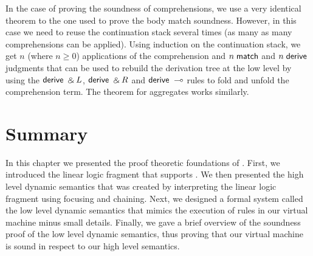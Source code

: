 In the case of proving the soundness of comprehensions, we use a very identical theorem to the one used
to prove the body match soundness. However, in this case we need to reuse the continuation stack several
times (as many as many comprehensions can be applied). Using induction on the continuation stack, we get
$n$ (where $n \ge 0$) applications of the comprehension and $n \; \mathsf{match}$ and $n \; \mathsf{derive}$ judgments
that can be used to rebuild the derivation tree at the low level by using the $\mathsf{derive} \; \mathbin{\binampersand} L$, $\mathsf{derive} \; \mathbin{\binampersand} R$
and $\mathsf{derive} \; \multimap$ rules to fold and unfold the comprehension term. The theorem for aggregates works similarly.

\section{Summary}

In this chapter we presented the proof theoretic foundations of \lang.
First, we introduced the linear logic fragment that supports \lang. We then presented the
high level dynamic semantics that was created by interpreting the linear logic fragment using
focusing and chaining. Next, we designed
a formal system called the low level dynamic semantics that mimics the execution of rules in
our virtual machine minus small details.
Finally, we gave a brief overview of the soundness proof of the low level dynamic semantics,
thus proving that our virtual machine is sound in respect to our high level semantics.

